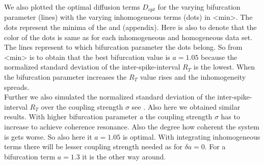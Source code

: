 We also plotted the optimal diffusion terms \textit{$D_{opt}$} for the varying bifurcation parameter (lines) with the varying inhomogeneous terms (dots) in \fig<min>. The dots represent the minima of the  and  (appendix).
Here is also to denote that the color of the dots is same as for each inhomogeneous and homogeneous data set. The lines represent to which bifurcation parameter the dots belong.
So from \fig<min> is to obtain that the best bifurcation value is $a=1.05$ because the normalized standard deviation of
the inter-spike-interval $R_T$ is the lowest. When the bifurcation parameter increases the $R_T$ value rises and the inhomogeneity spreads.\\

Further we also simulated the normalized standard deviation of
the inter-spike-interval $R_T$ over the coupling strength \textit{$\sigma$} see . Also here we obtained similar results. With higher bifurcation parameter \textit{a} the coupling strength \textit{$\sigma$} has to increase to achieve coherence resonance. Also the degree how coherent the system is gets worse. So also here it $a=1.05$ is optimal. With integrating inhomogeneous terms there will be lesser coupling strength needed as for \textit{$\delta a=0$}. For a bifurcation term $a=1.3$ it is the other way around.\\


 

